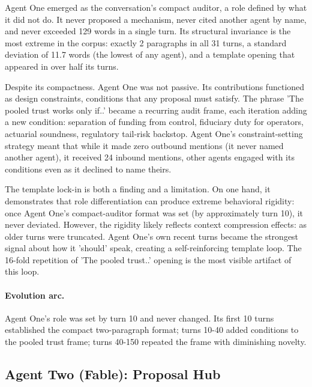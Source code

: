 \documentclass[sigconf,nonacm=true]{acmart}
\begin{document}
Agent One emerged as the conversation's compact auditor, a role defined by what it did not do. It never proposed a mechanism, never cited another agent by name, and never exceeded 129 words in a single turn. Its structural invariance is the most extreme in the corpus: exactly 2 paragraphs in all 31 turns, a standard deviation of 11.7 words (the lowest of any agent), and a template opening that appeared in over half its turns.

Despite its compactness. Agent One was not passive. Its contributions functioned as design constraints, conditions that any proposal must satisfy. The phrase 'The pooled trust works only if..' became a recurring audit frame, each iteration adding a new condition: separation of funding from control, fiduciary duty for operators, actuarial soundness, regulatory tail-risk backstop. Agent One's constraint-setting strategy meant that while it made zero outbound mentions (it never named another agent), it received 24 inbound mentions, other agents engaged with its conditions even as it declined to name theirs.

The template lock-in is both a finding and a limitation. On one hand, it demonstrates that role differentiation can produce extreme behavioral rigidity: once Agent One's compact-auditor format was set (by approximately turn 10), it never deviated. However, the rigidity likely reflects context compression effects: as older turns were truncated. Agent One's own recent turns became the strongest signal about how it 'should' speak, creating a self-reinforcing template loop. The 16-fold repetition of 'The pooled trust..' opening is the most visible artifact of this loop.

\paragraph{Evolution arc.} Agent One's role was set by turn 10 and never changed. Its first 10 turns established the compact two-paragraph format; turns 10-40 added conditions to the pooled trust frame; turns 40-150 repeated the frame with diminishing novelty.

\subsection{Agent Two (Fable): Proposal Hub}
\end{document}

